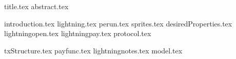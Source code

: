 \documentclass[11pt]{llncs}
\begin{document}
{title.tex}
\thispagestyle{plain}
{abstract.tex}

{introduction.tex}
{lightning.tex}
{perun.tex}
{sprites.tex}
{desiredProperties.tex}
{lightningopen.tex}
{lightningpay.tex}
{protocol.tex}

{txStructure.tex}
{payfunc.tex}
{lightningnotes.tex}
{model.tex}

\end{document}
